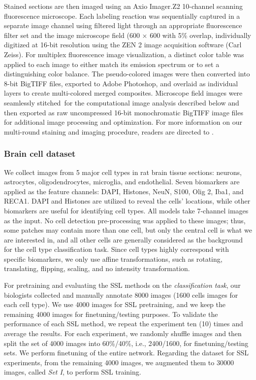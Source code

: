 \documentclass[10pt,twocolumn,letterpaper]{article}
\begin{document}
Stained sections are then imaged using an Axio Imager.Z2 10-channel scanning fluorescence microscope. Each labeling reaction was sequentially captured in a separate image channel using filtered light through an appropriate fluorescence filter set and the image microscope field (600 × 600 with 5\% overlap, individually digitized at 16-bit resolution using the ZEN 2 image acquisition software (Carl Zeiss). For multiplex fluorescence image visualization, a distinct color table was applied to each image to either match its emission spectrum or to set a distinguishing color balance. The pseudo-colored images were then converted into 8-bit BigTIFF files, exported to Adobe Photoshop, and overlaid as individual layers to create multi-colored merged composites. Microscope field images were seamlessly stitched for the computational image analysis described below and then exported as raw uncompressed 16-bit monochromatic BigTIFF image files for additional image processing and optimization. For more information on our multi-round staining and imaging procedure, readers are directed to \cite{maric2021whole}.







\subsubsection{Brain cell dataset} We collect images from 5 major cell types in rat brain tissue sections: neurons, astrocytes, oligodendrocytes, microglia, and endothelial. Seven biomarkers are applied as the feature channels: DAPI, Histones, NeuN, S100, Olig 2, Iba1, and RECA1. DAPI and Histones are utilized to reveal the cells' locations, while other biomarkers are useful for identifying cell types. All models take 7-channel images as the input. 
No cell detection pre-processing was applied to these images; thus, some patches may contain more than one cell, but only the central cell is what we are interested in, and all other cells are generally considered as the background for the cell type classification task. 
Since cell types highly correspond with specific biomarkers, we only use affine transformations, such as rotating, translating, flipping, scaling, and no intensity transformation.

For pretraining and evaluating the SSL methods on the {\textit{classification task}}, our biologists collected and manually annotate 8000 images (1600 cells images for each cell type). We use 4000 images for SSL pretraining, and we keep the remaining 4000 images for finetuning/testing purposes. To validate the performance of each SSL method, we repeat the experiment ten (10) times and average the results. For each experiment, we randomly shuffle images and then split the set of 4000 images into 60\%/40\%, i.e., 2400/1600, for finetuning/testing sets. We perform finetuning of the entire network. Regarding the dataset for SSL experiments, from the remaining 4000 images, we augmented them to 30000 images, called \textit{Set I}, to perform SSL training. 
\end{document}
